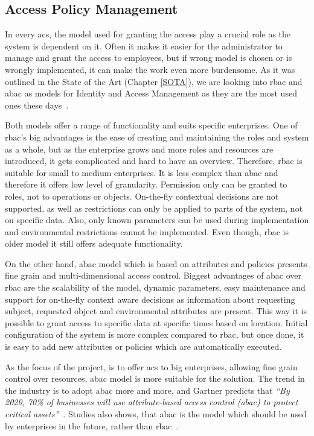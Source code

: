 \subsection{Access Policy Management}\label{Access_Policy_Management_Analysis}

In every \acrlong{acs}, the model used for granting the access play a crucial role as the system is dependent on it. Often it makes it easier for the administrator to manage and grant the access to employees, but if wrong model is chosen or is wrongly implemented, it can make the work even more burdensome. As it was outlined in the State of the Art (Chapter \ref{SOTA}), we are looking into \acrshort{rbac} and \acrshort{abac} as models for Identity and Access Management as they are the most used ones these days~\cite{2018BestV3}.

Both models offer a range of functionality and suits specific enterprises. One of \acrshort{rbac}’s big advantages is the ease of creating and maintaining the roles and system as a whole, but as the enterprise grows and more roles and resources are introduced, it gets complicated and hard to have an overview. Therefore, \acrshort{rbac} is suitable for small to medium enterprises. It is less complex than \acrshort{abac} and therefore it offers low level of granularity. Permission only can be granted to roles, not to operations or objects. On-the-fly contextual decisions are not supported, as well as restrictions can only be applied to parts of the system, not on specific data. Also, only known parameters can be used during implementation and environmental restrictions cannot be implemented. Even though, \acrshort{rbac} is older model it still offers adequate functionality.

On the other hand, \acrshort{abac} model which is based on attributes and policies presents fine grain and multi-dimensional access control. Biggest advantages of \acrshort{abac} over \acrshort{rbac} are the scalability of the model, dynamic parameters, easy maintenance and support for on-the-fly context aware decisions as information about requesting subject, requested object and environmental attributes are present. This way it is possible to grant access to specific data at specific times based on location. Initial configuration of the system is more complex compared to \acrshort{rbac}, but once done, it is easy to add new attributes or policies which are automatically executed. 

As the focus of the project, is to offer \acrlong{acs} to big enterprises, allowing fine grain control over resources, \acrlong{abac} model is more suitable for the solution. The trend in the industry is to adopt \acrshort{abac} more and more, and Gartner predicts that \textit{``By 2020, 70\% of businesses will use attribute-based access control (\acrshort{abac}) to protect critical assets''}~\cite{GartnerGartnerPredictions}. Studies also shows, that \acrshort{abac} is the model which should be used by enterprises in the future, rather than \acrshort{rbac}~\cite{Fatima2016TowardsArgument}.

